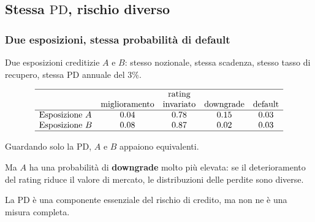 \subsection{Stessa \texorpdfstring{$\mathrm{PD}$}{PD}, rischio diverso}%

\begin{frame}%
%

\frametitle{Due esposizioni, stessa probabilit\`{a} di default}%
%

%


Due esposizioni creditizie $A$ e $B$: stesso nozionale, stessa scadenza,
stesso tasso di recupero, stessa $\mathrm{PD}$ annuale del $3\%$.

\medskip%

\[%
\begin{array}
[c]{lcccc}\hline
&  & \text{rating} &  & \\
& \text{miglioramento} & \text{invariato} & \text{downgrade} & \text{default}%
\\\hline
\text{Esposizione }A & 0.04 & 0.78 & 0.15 & 0.03\\
\text{Esposizione }B & 0.08 & 0.87 & 0.02 & 0.03\\\hline
\end{array}
\]


\medskip

\begin{stepitemize}
\item Guardando solo la $\mathrm{PD}$, $A$ e $B$ appaiono equivalenti.

\item Ma $A$ ha una probabilit\`{a} di \textbf{downgrade} molto pi\`{u}
elevata: se il deterioramento del rating riduce il valore di mercato, le
distribuzioni delle perdite sono diverse.

\item La $\mathrm{PD}$ \`{e} una componente essenziale del rischio di credito,
ma non ne \`{e} una misura completa.
\end{stepitemize}

%

\transboxout
\end{frame}%


